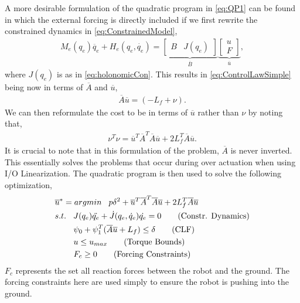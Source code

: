 A more desirable formulation of the quadratic program in \eqref{eq:QP1} can be found in which the external forcing 
is directly included if we first rewrite the constrained dynamics in \eqref{eq:ConstrainedModel},
\begin{align}
 M_{e}(q_{e}){\ddot{q_{e}}} + H_{e}(q_{e},\dot{q_{e}}) = 
 \underbrace{\begin{bmatrix}
  B & J(q_{e})
 \end{bmatrix}}_{\overline{B}}
 \underbrace{\begin{bmatrix}
  u \\
  F
 \end{bmatrix}}_{\overline{u}},
\end{align}
where $J(q_{e})$ is as in \eqref{eq:holonomicCon}. This results in \eqref{eq:ControlLawSimple} being now in terms of $\overline{A}$ and $\overline{u}$,
\begin{align}
 \overline{A}\overline{u} = (-L_{f} + \nu).
\end{align}
We can then reformulate the cost to be in terms of $\overline{u}$ rather than $\nu$ by 
noting that,
\begin{align}
  \nu^{T}\nu = \overline{u}^{T}\overline{A}^{T}\overline{A}\overline{u} + 2L^{T}_{f}\overline{A}\overline{u}.
\end{align}
It is crucial to note that in this formulation of the problem, $\overline{A}$ is never inverted. This essentially 
solves the problems that occur during over actuation when using I/O Linearization. The quadratic program 
is then used to solve the following optimization,
\begin{align}
& \overline{u}^{*} = argmin \hspace{3mm} p \delta^{2} + \overline{u}^{T}\overline{A}^{T}\overline{A}\overline{u} + 2L^{T}_{f}\overline{A}\overline{u} \\
& \vspace{3mm}
 s.t. \hspace{3mm} J(q_{e})\ddot{q_{e}} + \dot{J}(q_{e},\dot{q}_{e})\dot{q_{e}} = 0   \tag{Constr. Dynamics} \\
& \hspace{8mm} \psi_{0} + \psi^{T}_{1}(\overline{A}\overline{u} + L_{f}) \leq \delta	 \tag{CLF} \\
& \hspace{8mm} u \leq u_{max} \tag{Torque Bounds} \\
& \hspace{8mm} F_{c} \geq 0	\tag{Forcing Constraints}
\end{align}
$F_{c}$ represents the set all reaction forces between the robot and the ground. The forcing 
constraints here are used simply to ensure the robot is pushing into the ground.